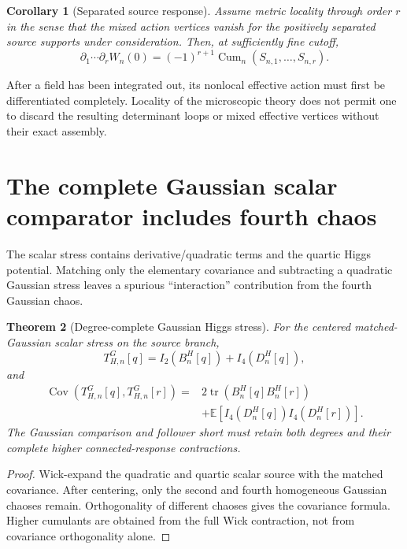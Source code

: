 \documentclass[11pt,a4paper,oneside]{book}
\theoremstyle{plain}
\newtheorem{theorem}{Theorem}[chapter]
\newtheorem{corollary}[theorem]{Corollary}
\theoremstyle{definition}
\theoremstyle{remark}
\newcommand{\E}{\mathbb E}
\newcommand{\tr}{\operatorname{tr}}
\newcommand{\Cov}{\operatorname{Cov}}
\newcommand{\Cum}{\operatorname{Cum}}
\newcommand{\src}[2]{\cite{#1}}
\begin{document}
\begin{corollary}[Separated source response]
\label{cor:separated-response}
Assume metric locality through order $r$ in the sense that the mixed action vertices vanish for the positively separated source supports under consideration. Then, at sufficiently fine cutoff,
\begin{equation}
 \partial_1\cdots\partial_rW_n(0)
 =(-1)^{r+1}\Cum_n(S_{n,1},\ldots,S_{n,r}).
 \label{eq:separated-response}
\end{equation}
\end{corollary}
\src{R18}{thm:v18v40-separated-response}
After a field has been integrated out, its nonlocal effective action must first be differentiated completely. Locality of the microscopic theory does not permit one to discard the resulting determinant loops or mixed effective vertices without their exact assembly.

\section{The complete Gaussian scalar comparator includes fourth chaos}
The scalar stress contains derivative/quadratic terms and the quartic Higgs potential. Matching only the elementary covariance and subtracting a quadratic Gaussian stress leaves a spurious ``interaction'' contribution from the fourth Gaussian chaos.

\begin{theorem}[Degree-complete Gaussian Higgs stress]
\label{thm:gaussian-stress}
For the centered matched-Gaussian scalar stress on the source branch,
\begin{equation}
 T_{H,n}^{G}[q]=I_2(B_n^H[q])+I_4(D_n^H[q]),
 \label{eq:gaussian-stress}
\end{equation}
and
\begin{equation}
\begin{split}
 \Cov(T_{H,n}^{G}[q],T_{H,n}^{G}[r])
 ={}&2\tr(B_n^H[q]B_n^H[r])\\
 &+\E[I_4(D_n^H[q])I_4(D_n^H[r])].
\end{split}
\end{equation}
The Gaussian comparison and follower short must retain both degrees and their complete higher connected-response contractions.
\end{theorem}
\begin{proof}
Wick-expand the quadratic and quartic scalar source with the matched covariance. After centering, only the second and fourth homogeneous Gaussian chaoses remain. Orthogonality of different chaoses gives the covariance formula. Higher cumulants are obtained from the full Wick contraction, not from covariance orthogonality alone.
\end{proof}
\src{R18}{thm:v18v42-complete-gaussian,prop:v18v42-degree-complete-short}
\end{document}
